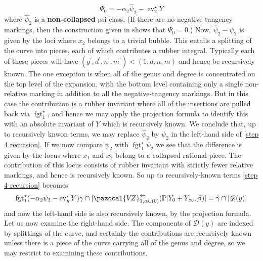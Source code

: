 \documentclass[11pt]{amsart}
\newcommand{\VZ}{\pazocal{V\!Z}}
\newcommand{\st}{\star}
\newcommand{\ev}{\operatorname{ev}}
\newcommand{\fgt}{\operatorname{fgt}}
\newcommand{\Dcal}{\mathcal{D}}
\theoremstyle{definition}
\theoremstyle{definition}
\begin{document}
\begin{equation*}\label{Psi0 formula} \Psi_0 = -\alpha_2 \hat\psi_2 - \ev_2^\st Y \end{equation*}
where $\hat\psi_2$ is a \textbf{non-collapsed} psi class. (If there are no negative-tangency markings, then the construction given in \cite[\S 1.5.2]{MaulikPandharipande} shows that $\Psi_0=0$.) Now, $\hat\psi_2 - \psi_2$ is given by the loci where $x_2$ belongs to a trivial bubble. This entails a splitting of the curve into pieces, each of which contributes a rubber integral. Typically each of these pieces will have $(g^\prime,d^\prime,n^\prime,m^\prime) < (1,d,n,m)$ and hence be recursively known. The one exception is when all of the genus and degree is concentrated on the top level of the expansion, with the bottom level containing only a single non-relative marking in addition to all the negative-tangency markings. But in this case the contribution is a rubber invariant where all of the insertions are pulled back via $\fgt_1^\st$, and hence we may apply the projection formula to identify this with an absolute invariant of $Y$ which is recursively known. We conclude that, up to recursively knwon terms, we may replace $\hat\psi_2$ by $\psi_2$ in the left-hand side of \eqref{step 4 recursion}. If we now compare $\psi_2$ with $\fgt_1^\st \psi_2$ we see that the difference is given by the locus where $x_1$ and $x_2$ belong to a collapsed rational piece. The contribution of this locus consists of rubber invariant with strictly fewer relative markings, and hence is recursively known. So up to recursively-known terms \eqref{step 4 recursion} becomes
\begin{equation*} \fgt_1^\st (-\alpha_2\psi_2 - \ev_y^\st Y)\tilde\gamma \cap [\VZ^{\leftrightarrow}_{1,\alpha\cup(0)}(\mathbb P|Y_0+Y_\infty,\beta)] = \tilde\gamma\cap[\Dcal(y)]\end{equation*}
and now the left-hand side is also recursively known, by the projection formula. Let us now examine the right-hand side. The components of $\Dcal(y)$ are indexed by splittings of the curve, and certainly the contributions are recursively known unless there is a piece of the curve carrying all of the genus and degree, so we may restrict to examining these contributions.
\end{document}
